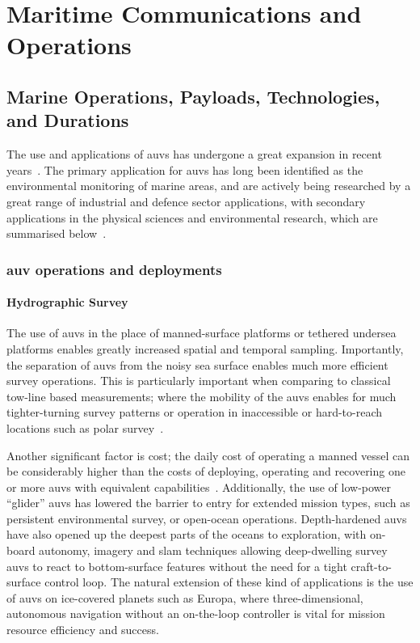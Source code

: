 \chapter{Maritime Communications and Operations}
\label{ch:maritime_background}

\section{Marine Operations, Payloads, Technologies, and Durations}\label{sec:marine_ops}

The use and applications of \glspl{auv} has undergone a great expansion in recent years~\cite{Alam2014}.
The primary application for \glspl{auv} has long been identified as the environmental monitoring of marine areas, and are actively being researched by a great range of industrial and defence sector applications, with secondary applications in the physical sciences and environmental research, which are summarised below~\cite{Bingham2002,Wynn2014}.


\subsection{\gls{auv} operations and deployments}\label{sec:auv_ops}

\subsubsection{Hydrographic Survey}

The use of \glspl{auv} in the place of manned-surface platforms or tethered undersea platforms enables greatly increased spatial and temporal sampling.
Importantly, the separation of \glspl{auv} from the noisy sea surface enables much more efficient survey operations.
This is particularly important when comparing to classical tow-line based measurements; where the mobility of the \glspl{auv} enables for much tighter-turning survey patterns or operation in inaccessible or hard-to-reach locations such as polar survey~\cite{Curtin1993}.

Another significant factor is cost; the daily cost of operating a manned vessel can be considerably higher than the costs of deploying, operating and recovering one or more \glspl{auv} with equivalent capabilities~\cite{Nicholson2008}.
Additionally, the use of low-power ``glider'' \glspl{auv} has lowered the barrier to entry for extended mission types, such as persistent environmental survey, or open-ocean operations. 
Depth-hardened \glspl{auv} have also opened up the deepest parts of the oceans to exploration, with on-board autonomy, imagery and \gls{slam} techniques allowing deep-dwelling survey \glspl{auv} to react to bottom-surface features without the need for a tight craft-to-surface control loop.
The natural extension of these kind of applications is the use of \glspl{auv} on ice-covered planets such as Europa, where three-dimensional, autonomous navigation without an on-the-loop controller is vital for mission resource efficiency and success.

